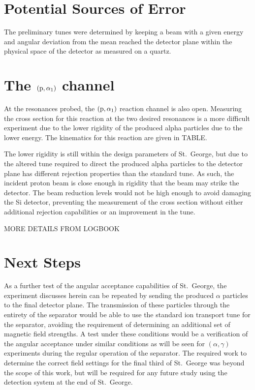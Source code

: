\section{Potential Sources of Error}
\label{sec:potential-sources-of-error}

The preliminary tunes were determined by keeping a beam with a given
energy and angular deviation from the mean reached the detector plane
within the physical space of the detector as measured on a quartz.


\section{The $(\rm{p},\alpha_1)$ channel}
\label{sec:the-palpha_1-channel}

At the resonances probed, the $(\rm{p},\alpha_1)$ reaction channel is
also open. Measuring the cross section for this reaction at the two
desired resonances is a more difficult experiment due to the lower
rigidity of the produced alpha particles due to the lower energy. The
kinematics for this reaction are given in TABLE.

The lower rigidity is still within the design parameters of St.\ George,
but due to the altered tune required to direct the produced alpha
particles to the detector plane has different rejection properties than
the standard tune. As such, the incident proton beam is close enough in
rigidity that the beam may strike the detector. The beam reduction
levels would not be high enough to avoid damaging the Si detector,
preventing the measurement of the cross section without either
additional rejection capabilities or an improvement in the tune.

MORE DETAILS FROM LOGBOOK


\section{Next Steps}
\label{sec:next-steps}

As a further test of the angular acceptance capabilities of St.\ George,
the experiment discusses herein can be repeated by sending the produced
$\alpha$ particles to the final detector plane. The transmission of
these particles through the entirety of the separator would be able to
use the standard ion transport tune for the separator, avoiding the
requirement of determining an additional set of magnetic field
strengths. A test under these conditions would be a verification of the
angular acceptance under similar conditions as will be seen for
$(\alpha,\gamma)$ experiments during the regular operation of the
separator. The required work to determine the correct field settings for
the final third of St.\ George was beyond the scope of this work, but
will be required for any future study using the detection system at the
end of St.\ George.

